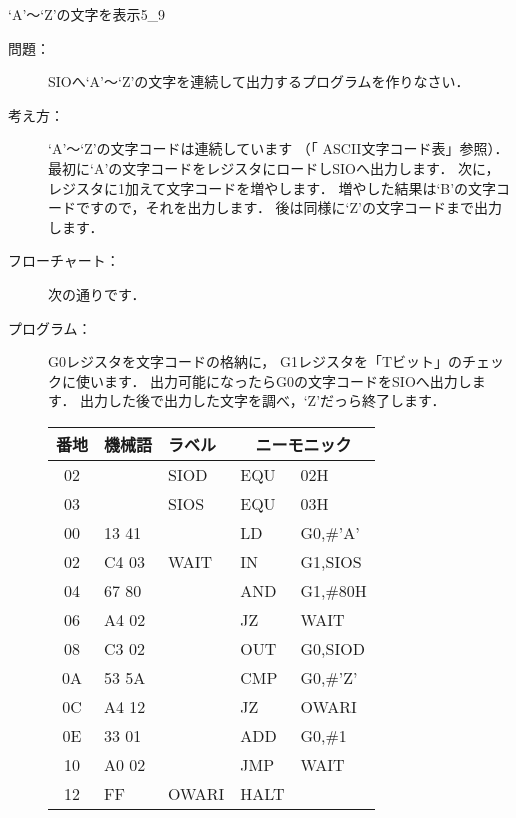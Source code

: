 \begin{reidai}{`A'〜`Z'の文字を表示}{5_9}
\begin{description}
\item[問題：] SIOへ`A'〜`Z'の文字を連続して出力するプログラムを作りなさい．

\item[考え方：]
`A'〜`Z'の文字コードは連続しています
（「 ASCII文字コード表」参照）．
最初に`A'の文字コードをレジスタにロードしSIOへ出力します．
次に，レジスタに1加えて文字コードを増やします．
増やした結果は`B'の文字コードですので，それを出力します．
後は同様に`Z'の文字コードまで出力します．

\item[フローチャート：]
次の通りです．

\begin{center}
\end{center}

\item[プログラム：]
G0レジスタを文字コードの格納に，
G1レジスタを「Tビット」のチェックに使います．
出力可能になったらG0の文字コードをSIOへ出力します．
出力した後で出力した文字を調べ，`Z'だっら終了します．

{\tt\footnotesize\begin{center}
\begin{tabular}{|c|l|l|l l|} \hline
番地 & 機械語 & ラベル & \multicolumn{2}{|c|}{ニーモニック} \\
\hline
02 &       & SIOD  & EQU  & 02H             \\
03 &       & SIOS  & EQU  & 03H             \\
00 & 13 41 &       & LD   & G0,\#'A'        \\
02 & C4 03 & WAIT  & IN   & G1,SIOS         \\
04 & 67 80 &       & AND  & G1,\#80H        \\
06 & A4 02 &       & JZ   & WAIT            \\
08 & C3 02 &       & OUT  & G0,SIOD         \\
0A & 53 5A &       & CMP  & G0,\#'Z'        \\
0C & A4 12 &       & JZ   & OWARI           \\
0E & 33 01 &       & ADD  & G0,\#1          \\
10 & A0 02 &       & JMP  & WAIT            \\
12 & FF    & OWARI & HALT &                 \\
\hline
\end{tabular}
\end{center}}
\end{description}
\end{reidai}

